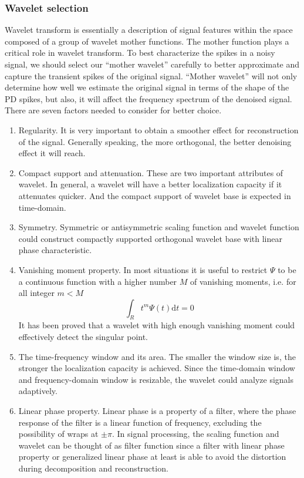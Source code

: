 \subsubsection{Wavelet selection}
Wavelet transform is essentially a description of signal features within
the space composed of a group of wavelet mother functions. The mother
function plays a critical role in wavelet transform. To best
characterize the spikes in a noisy signal, we should select our
``mother wavelet'' carefully to better approximate and capture the
transient spikes of the original signal. ``Mother wavelet'' will not
only determine how well we estimate the original signal in terms of
the shape of the PD spikes, but also, it will affect the frequency
spectrum of the denoised signal. There are seven factors needed to
consider for better choice\cite{xin2003fan}. 
\begin{enumerate}[(1)]
    \item Regularity. It is very important to obtain a smoother effect
        for reconstruction of the signal. Generally speaking, the
        more orthogonal, the better denoising effect it will reach.
    \item Compact support and attenuation. These are two important
        attributes of wavelet. In general, a wavelet will have a
        better localization capacity if it attenuates quicker. And the
        compact support of wavelet base is expected in time-domain.
    \item Symmetry. Symmetric or antisymmetric scaling function and
        wavelet function could construct compactly supported
        orthogonal wavelet base with linear phase characteristic. 
    \item Vanishing moment property. In most situations it is useful
        to restrict $\Psi$ to be a continuous function with a higher number
        $M$ of vanishing moments, i.e. for all integer $m<M$
        \begin{equation}
            \int_R t^m \Psi(t) \mathrm{d}t=0
            \label{waveletvanish}
        \end{equation} 
        It has been proved that a wavelet with high enough vanishing
        moment could effectively detect the singular point.
    \item The time-frequency window and its area. The smaller the
        window size is, the stronger the localization capacity is
        achieved. Since the time-domain window and frequency-domain
        window is resizable, the wavelet could analyze signals adaptively. 
    \item Linear phase property. Linear phase is a property of a filter, where
        the phase response of the filter is a linear function of
        frequency, excluding the possibility of wraps at $\pm\pi$. 
        In signal processing, the scaling function and wavelet can be
        thought of as filter function since a filter with linear phase
        property or generalized linear phase at least is able to avoid
        the distortion during decomposition and reconstruction. 
\end{enumerate}

